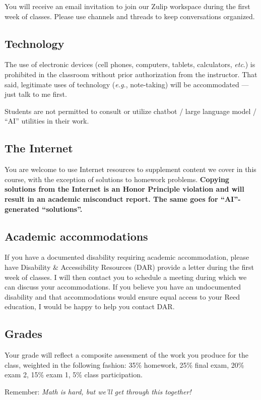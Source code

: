 \documentclass[11pt,twoside]{amsart}
\begin{document}
You will receive an email invitation to join our Zulip workspace during the first week of classes. Please use channels and threads to keep conversations organized.

\subsection*{Technology}
The use of electronic devices (cell phones, computers, tablets, 
calculators, \emph{etc}.) is prohibited in the classroom without prior 
authorization from the instructor.  That said, legitimate uses 
of technology (\emph{e.g.}, note-taking) will be accommodated --- 
just talk to me first.

Students are not permitted to consult or utilize chatbot / large language model / ``AI'' utilities in their work.

\subsection*{The Internet}
You are welcome to use Internet resources to supplement content we cover in this course, with the exception of solutions to homework problems.  \textbf{Copying solutions from the Internet is an Honor Principle violation and will result in an academic misconduct report. The same goes for ``AI''-generated ``solutions''.}

\subsection*{Academic accommodations}
If you have a documented disability requiring academic accommodation, please have  Disability \& Accessibility Resources (DAR)  provide a letter during the first week of classes.  I will then contact you to schedule a meeting during which we can discuss your accommodations.  If you believe you have an undocumented disability and that accommodations would ensure equal access to your Reed education, I would be happy to help you contact DAR.

\subsection*{Grades}
Your grade will reflect a composite assessment of the work you produce for the class, weighted in the following fashion:  35\% homework, 25\% final exam, 20\% exam 2, 15\% exam 1, 5\% class participation.

\bigskip \bigskip

\begin{center}
Remember: \emph{Math is hard, but we'll get through this together!}
\end{center}
\end{document}
